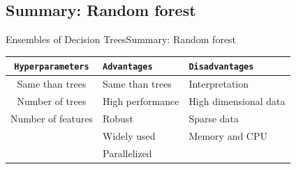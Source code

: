 \documentclass[10pt,compress]{beamer} %
\begin{document}
\subsection{Summary: Random forest}
\begin{frame}{Ensembles of Decision Trees}{Summary: Random forest}
	\begin{center}
	\begin{tabular}{cp{3cm}p{3cm}}\hline
	 	\texttt{Hyperparameters}  & \texttt{Advantages}  & \texttt{Disadvantages} \\\hline
	 	Same than trees           & Same than trees      & Interpretation  \\
	 	Number of trees           & High performance     & High dimensional data  \\
	    Number of features        & Robust               & Sparse data  \\
	 	                          & Widely used          & Memory and CPU  \\
	 	                          & Parallelized         &   \\
	 	\hline
	\end{tabular}
	\end{center}
\end{frame}
\end{document}
